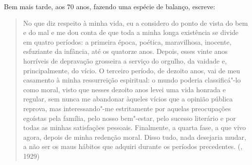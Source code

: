 Bem mais tarde, aos 70 anos, fazendo uma espécie de balanço, escreve:

\begin{quote}
No que diz respeito à minha vida, eu a considero do ponto de vista do
bem e do mal e me dou conta de que toda a minha longa
existência se divide em quatro períodos: a primeira época, poética,
maravilhosa, inocente, esfuziante da infância, até os quatorze anos.
Depois, esses vinte anos horríveis de depravação grosseira a serviço do
orgulho, da vaidade e, principalmente, do vício. O terceiro período, de
dezoito anos, vai de meu casamento à minha ressurreição espiritual: o
mundo poderia classificá"-lo como moral, visto que nesses dezoito anos
levei uma vida honrada e regular, sem nunca me abandonar àqueles vícios
que a opinião pública reprova, mas interessando"-me estritamente por
aquelas preocupações egoístas pela família, pelo nosso bem"-estar, pelo
sucesso literário e por todas as minhas satisfações pessoais. Finalmente,
a quarta fase, a que vivo agora, depois de minha redenção moral. Disso
tudo, nada desejaria mudar, a não ser os maus hábitos que adquiri
durante os períodos precedentes. (, 1929) 
\end{quote}

